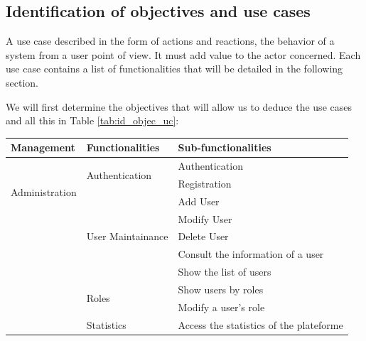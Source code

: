 \subsection{Identification of objectives and use cases}
A use case described in the form of actions and reactions, the behavior of a system from a user point of view. It must add value to the actor concerned. Each use case contains a list of functionalities that will be detailed in the following section.

We will first determine the objectives that will allow us to deduce the use cases and all this in Table \ref{tab:id_objec_uc}:
\begin{longtable}{|m{10em}|m{10em}|m{10em}|}\hline
Management & Functionalities        &   Sub-functionalities                        \\\hline
    \multirow{4}{*}{Administration} & \multirow{2}{*}{Authentication}       & Authentication                          \\\cline{3-3}
                                               &                                       & Registration                            \\\cline{2-3}
                                               & \multirow{5}{*}{User Maintainance}    & Add User                                \\\cline{3-3}
                                               &                                       & Modify User                             \\\cline{3-3}
                                               &                                       & Delete User                             \\\cline{3-3}
                                               &                                       & Consult the information of a user       \\\cline{3-3}
                                               &                                       & Show the list of users                  \\\cline{2-3}
                                               & \multirow{2}{*}{Roles}                & Show users by roles                     \\\cline{3-3}
                                               &                                       & Modify a user's role                    \\\cline{2-3}
                                               & \multirow{1}{*}{Statistics}           & Access the statistics of the plateforme \\\hline

\end{longtable}
